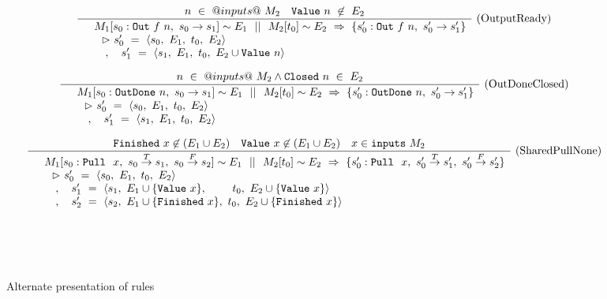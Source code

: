 \begin{figure*}
$$
\frac {\displaystyle 
    n~\in~@inputs@~M_2
    \quad
    \mathtt{Value}~n~\not\in~E_2
} {\displaystyle 
\begin{array}{ll}
 & M_1  [  s_0  : \mathtt{Out}~f~n,~ s_0 \to s_1]
        \sim E_1 ~~||~~ M_2[t_0] \sim E_2  
~\Rightarrow~ 
        \{ s_0' : \mathtt{Out}~f~n,~ s_0' \to s_1'\} \\
 & ~~ \rhd ~s_0'  ~=~ \langle  s_0,~ E_1,~ t_0,~ E_2  \rangle \\
 & ~~~,  ~~~ s_1' ~=~ \langle  s_1,~ E_1,~ t_0,~ E_2 \cup \mathtt{Value}~n  \rangle \\
\end{array}
} \ 
\textrm{(OutputReady)}
$$

$$
\frac {\displaystyle 
    n~\in~@inputs@~M_2
    \wedge
    \mathtt{Closed}~n~\in~E_2
} {\displaystyle 
\begin{array}{ll}
 & M_1  [  s_0  : \mathtt{OutDone}~n,~ s_0 \to s_1]
        \sim E_1 ~~||~~ M_2[t_0] \sim E_2  
~\Rightarrow~ 
        \{ s_0' : \mathtt{OutDone}~n,~ s_0' \to s_1'\} \\
 & ~~ \rhd ~s_0'  ~=~ \langle  s_0,~ E_1,~ t_0,~ E_2  \rangle \\
 & ~~~,  ~~~ s_1' ~=~ \langle  s_1,~ E_1,~ t_0,~ E_2  \rangle \\
\end{array}
} \ 
\textrm{(OutDoneClosed)}
$$



$$
\frac {\displaystyle 
\mathtt{Finished}~x \not \in (E_1 \cup E_2) \quad
\mathtt{Value}~x    \not \in (E_1 \cup E_2) \quad
x \in \mathtt{inputs}~M_2
} {\displaystyle 
\begin{array}{ll}
 & M_1  [  s_0  : \mathtt{Pull}~~x,~ s_0  \stackrel{T}{\to} s_1,~  s_0  \stackrel{F}{\to} s_2] 
        \sim E_1 ~~||~~ M_2[t_0] \sim E_2  
~\Rightarrow~ 
        \{ s_0' : \mathtt{Pull}~~x,~ s_0' \stackrel{T}{\to} s_1',~ s_0' \stackrel{F}{\to} s_2' \} \\
 & ~~ \rhd ~s_0'  ~=~ \langle  s_0,~ E_1,~ t_0,~ E_2  \rangle \\
 & ~~~,  ~~~ s_1' ~=~ \langle  s_1,~ E_1 \cup \{ \mathtt{Value}~x \},~~~~~~~ t_0,~ E_2 \cup \{ \mathtt{Value}~x    \}  \rangle \\
 & ~~~,  ~~~ s_2' ~=~ \langle  s_2,~ E_1 \cup \{ \mathtt{Finished}~x \},~    t_0,~ E_2 \cup \{ \mathtt{Finished}~x \}  \rangle
\end{array}
} \ 
\textrm{(SharedPullNone)}
$$

\medskip
{} \\
 \\
 \\

\caption{Alternate presentation of rules}
\label{fig:merge:alt}
\end{figure*}

